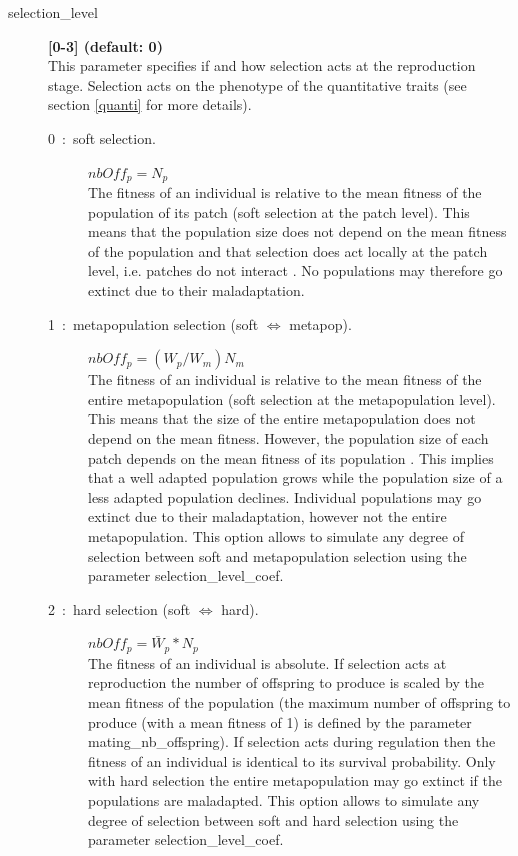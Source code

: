 \documentclass[letterpaper,12pt,oneside]{book}
\begin{document}
\begin{description}
\item[selection\_level] \textbf{[0-3] (default: 0)}\\
This parameter specifies if and how selection acts at the reproduction stage. Selection acts on the phenotype of the quantitative traits (see section \ref{quanti} for more details).
\begin{description}
\item [0~:~soft selection.] $nbOff_{p} = N_{p}$\\
The fitness of an individual is relative to the mean fitness of the population of its patch (soft selection at the patch level). This means that the population size does not depend on the mean fitness of the population and that selection does act locally at the patch level, i.e. patches do not interact \citep{Wallace_1975}. No populations may therefore go extinct due to their maladaptation.

\item [1~:~metapopulation selection (soft $\Leftrightarrow$ metapop).] $nbOff_{p} = (W_{p}/W_{m})N_{m}$\\
The fitness of an individual is relative to the mean fitness of the entire metapopulation (soft selection at the metapopulation level). This means that the size of the entire metapopulation does not depend on the mean fitness. However, the population size of each patch depends on the mean fitness of its population \citep{Ravigne_2004}. This implies that a well adapted population grows while the population size of a less adapted population declines. Individual populations may go extinct due to their maladaptation, however not the entire metapopulation. This option allows to simulate any degree of selection between soft and metapopulation selection using the parameter \textsf{selection\_level\_coef}.

\item [2~:~hard selection (soft $\Leftrightarrow$ hard).] $nbOff_{p} = \bar{W}_{p}*N_{p}$\\
The fitness of an individual is absolute. If selection acts at reproduction the number of offspring to produce is scaled by the mean fitness of the population (the maximum number of offspring to produce (with a mean fitness of 1) is defined by the parameter \textsf{mating\_nb\_offspring}). If selection acts during regulation then the fitness of an individual is identical to its survival probability. Only with hard selection the entire metapopulation may go extinct if the populations are maladapted. This option allows to simulate any degree of selection between soft and hard selection using the parameter \textsf{selection\_level\_coef}. 


\end{description}
\end{description}
\end{document}
